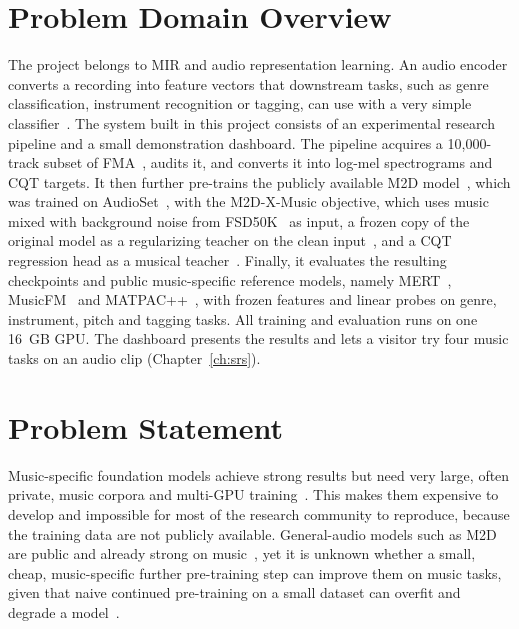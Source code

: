 \documentclass{FastFyp}
\begin{document}
\section{Problem Domain Overview}
\label{sec:vision-domain}
The project belongs to MIR and audio representation learning. An audio encoder converts a recording into feature vectors that downstream tasks, such as genre classification, instrument recognition or tagging, can use with a very simple classifier~\cite{ref:Turian:2022hear,ref:Yuan:2023marble}. The system built in this project consists of an experimental research pipeline and a small demonstration dashboard. The pipeline acquires a 10,000-track subset of FMA~\cite{ref:Defferrard:2017fma}, audits it, and converts it into log-mel spectrograms and CQT targets. It then further pre-trains the publicly available M2D model~\cite{ref:Niizumi:2023m2d}, which was trained on AudioSet~\cite{ref:Gemmeke:2017audioset}, with the M2D-X-Music objective, which uses music mixed with background noise from FSD50K~\cite{ref:Fonseca:2022fsd50k} as input, a frozen copy of the original model as a regularizing teacher on the clean input~\cite{ref:Niizumi:2024m2dx}, and a CQT regression head as a musical teacher~\cite{ref:Li:2024mert}. Finally, it evaluates the resulting checkpoints and public music-specific reference models, namely MERT~\cite{ref:Li:2024mert}, MusicFM~\cite{ref:Won:2024musicfm} and MATPAC++~\cite{ref:Quelennec:2025matpacpp}, with frozen features and linear probes on genre, instrument, pitch and tagging tasks. All training and evaluation runs on one 16~GB GPU. The dashboard presents the results and lets a visitor try four music tasks on an audio clip (Chapter~\ref{ch:srs}).

\section{Problem Statement}
\label{sec:vision-statement}
Music-specific foundation models achieve strong results but need very large, often private, music corpora and multi-GPU training~\cite{ref:Li:2024mert,ref:Won:2024musicfm,ref:Gu:2026pupum2d}. This makes them expensive to develop and impossible for most of the research community to reproduce, because the training data are not publicly available. General-audio models such as M2D are public and already strong on music~\cite{ref:Niizumi:2024m2dx,ref:Quelennec:2025matpacpp}, yet it is unknown whether a small, cheap, music-specific further pre-training step can improve them on music tasks, given that naive continued pre-training on a small dataset can overfit and degrade a model~\cite{ref:Zhang:2025sonar}.
\end{document}
